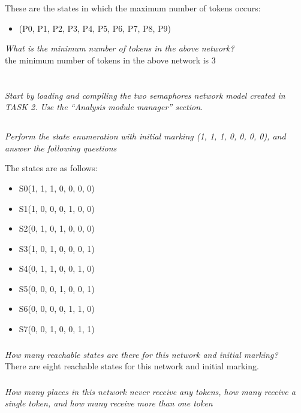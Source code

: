 \documentclass[letterpaper]{article}
\begin{document}
These are the states in which the maximum number of tokens occurs:
\begin{itemize}
 \item (P0, P1, P2, P3, P4, P5, P6, P7, P8, P9)
\end{itemize}

\textit{What is the minimum number of tokens in the above network?}\\

the minimum number of tokens in the above network is 3

\section{}

\textit{Start by loading and compiling the two semaphores network model created in TASK 2. Use the “Analysis module manager” section.}

\subsection{}
\textit{Perform the state enumeration with initial marking (1, 1, 1, 0, 0, 0, 0), and answer the following questions}

The states are as follows:
\begin{itemize}
 \item S0(1, 1, 1, 0, 0, 0, 0)
 \item S1(1, 0, 0, 0, 1, 0, 0)
 \item S2(0, 1, 0, 1, 0, 0, 0)
 \item S3(1, 0, 1, 0, 0, 0, 1)
 \item S4(0, 1, 1, 0, 0, 1, 0)
 \item S5(0, 0, 0, 1, 0, 0, 1)
 \item S6(0, 0, 0, 0, 1, 1, 0)
 \item S7(0, 0, 1, 0, 0, 1, 1)
\end{itemize}

\subsubsection{}
\textit{How many reachable states are there for this network and initial marking?}\\

There are eight reachable states for this network and initial marking.

\subsubsection{}
\textit{How many places in this network never receive any tokens, how many receive a single token, and how many receive more than one token}\\
\end{document}
